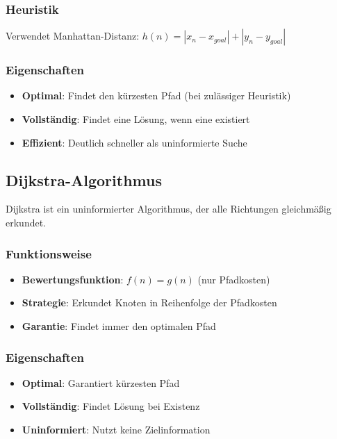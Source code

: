 \documentclass[12pt,a4paper]{article}
\begin{document}
\subsubsection{Heuristik}
Verwendet Manhattan-Distanz: $h(n) = |x_n - x_{goal}| + |y_n - y_{goal}|$

\subsubsection{Eigenschaften}
\begin{itemize}
    \item \textbf{Optimal}: Findet den kürzesten Pfad (bei zulässiger Heuristik)
    \item \textbf{Vollständig}: Findet eine Lösung, wenn eine existiert
    \item \textbf{Effizient}: Deutlich schneller als uninformierte Suche
\end{itemize}

\subsection{Dijkstra-Algorithmus}

Dijkstra ist ein uninformierter Algorithmus, der alle Richtungen gleichmäßig erkundet.

\subsubsection{Funktionsweise}
\begin{itemize}
    \item \textbf{Bewertungsfunktion}: $f(n) = g(n)$ (nur Pfadkosten)
    \item \textbf{Strategie}: Erkundet Knoten in Reihenfolge der Pfadkosten
    \item \textbf{Garantie}: Findet immer den optimalen Pfad
\end{itemize}

\subsubsection{Eigenschaften}
\begin{itemize}
    \item \textbf{Optimal}: Garantiert kürzesten Pfad
    \item \textbf{Vollständig}: Findet Lösung bei Existenz
    \item \textbf{Uninformiert}: Nutzt keine Zielinformation
\end{itemize}
\end{document}
